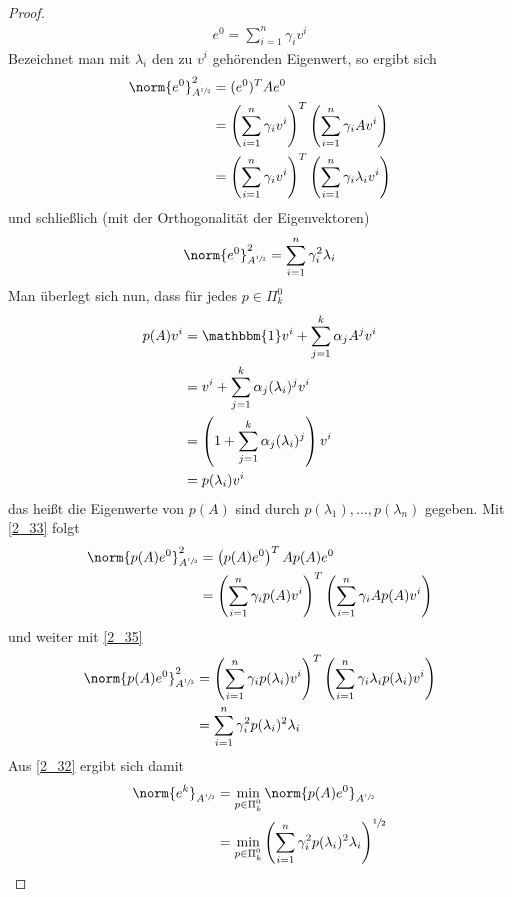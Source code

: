 \begin{proof}
	\begin{align}
		\label{2_33}
		e^0 = \sum_{i=1}^n \gamma_iv^i
	\end{align}
	Bezeichnet man mit $\lambda_i$ den zu $v^i$ gehörenden Eigenwert, so ergibt sich
	\begin{align}
		\norm{e^0}^2_{A^{\sfrac{1}{2}}} &= (e^0)^TAe^0 \notag \\
		&= \left(\sum_{i=1}^n \gamma_iv^i\right)^T\left(\sum_{i=1}^n\gamma_iAv^i\right) \notag \\
		&= \left(\sum_{i=1}^n \gamma_iv^i\right)^T\left(\sum_{i=1}^n\gamma_i\lambda_iv^i\right) \notag
	\end{align}
	und schließlich (mit der Orthogonalität der Eigenvektoren)
	\begin{align}
		\label{2_34}
		\norm{e^0}^2_{A^{\sfrac{1}{2}}} = \sum_{i=1}^n\gamma_i^2\lambda_i
	\end{align}
	Man überlegt sich nun, dass für jedes $p\in\Pi_k^0$
	\begin{align}
		\label{2_35}
		\begin{split}
			p(A)v^i &= \mathbbm{1}v^i + \sum_{j=1}^k\alpha_jA^jv^i  \\
			&= v^i + \sum_{j=1}^k\alpha_j(\lambda_i)^jv^i  \\
			&= \left(1+\sum_{j=1}^k\alpha_j(\lambda_i)^j\right)v^i  \\
			&= p(\lambda_i)v^i 
		\end{split}
	\end{align}
	das heißt die Eigenwerte von $p(A)$ sind durch $p(\lambda_1),...,p(\lambda_n)$ gegeben. Mit \cref{2_33} folgt
	\begin{align}
		\norm{p(A)e^0}^2_{A^{\sfrac{1}{2}}} &= \left(p(A)e^0\right)^TAp(A)e^0 \notag \\
		&= \left(\sum_{i=1}^n \gamma_ip(A)v^i\right)^T\left(\sum_{i=1}^n\gamma_iAp(A)v^i\right)\notag
	\end{align}
	und weiter mit \cref{2_35}
	\begin{align}
		\norm{p(A)e^0}^2_{A^{\sfrac{1}{2}}} &= \left(\sum_{i=1}^n\gamma_ip(\lambda_i)v^i\right)^T \left(\sum_{i=1}^n\gamma_i\lambda_ip(\lambda_i)v^i\right) \notag \\
		&= \sum_{i=1}^n \gamma_i^2p(\lambda_i)^2\lambda_i \notag
	\end{align}
	Aus \cref{2_32} ergibt sich damit
	\begin{align}
		\norm{e^k}_{A^{\sfrac{1}{2}}} &= \min_{p\in\Pi^0_k}\norm{p(A)e^0}_{A^{\sfrac{1}{2}}} \notag \\
		&= \min_{p\in\Pi^0_k}\left(\sum_{i=1}^n\gamma_i^2p(\lambda_i)^2\lambda_i\right)^{\sfrac{1}{2}} \notag

\end{align}
\end{proof}
